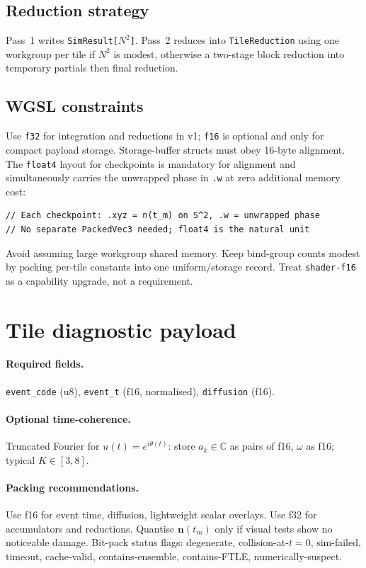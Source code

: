 \documentclass[11pt]{report}
\begin{document}
\subsection{Reduction strategy}

Pass~1 writes \texttt{SimResult[$N^2$]}. Pass~2 reduces into \texttt{TileReduction} using one workgroup per tile if $N^2$ is modest, otherwise a two-stage block reduction into temporary partials then final reduction.

\subsection{WGSL constraints}

Use \texttt{f32} for integration and reductions in v1; \texttt{f16} is optional and only for compact payload storage. Storage-buffer structs must obey 16-byte alignment. The \texttt{float4} layout for checkpoints is mandatory for alignment and simultaneously carries the unwrapped phase in \texttt{.w} at zero additional memory cost:
\begin{verbatim}
// Each checkpoint: .xyz = n(t_m) on S^2, .w = unwrapped phase
// No separate PackedVec3 needed; float4 is the natural unit
\end{verbatim}
Avoid assuming large workgroup shared memory. Keep bind-group counts modest by packing per-tile constants into one uniform/storage record. Treat \texttt{shader-f16} as a capability upgrade, not a requirement.

\section{Tile diagnostic payload}
\label{sec:tile_payload}

\paragraph{Required fields.}
\texttt{event\_code} (u8), \texttt{event\_t} (f16, normalised), \texttt{diffusion} (f16).

\paragraph{Optional time-coherence.} Truncated Fourier for $u(t)=e^{i\theta(t)}$: store $a_k\in\mathbb C$ as pairs of f16, $\omega$ as f16; typical $K\in[3,8]$.

\paragraph{Packing recommendations.} Use f16 for event time, diffusion, lightweight scalar overlays. Use f32 for accumulators and reductions. Quantise $\mathbf n(t_m)$ only if visual tests show no noticeable damage. Bit-pack status flags: degenerate, collision-at-$t{=}0$, sim-failed, timeout, cache-valid, contains-ensemble, contains-FTLE, numerically-suspect.
\end{document}
